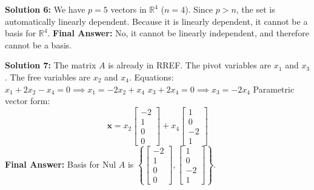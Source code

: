 \documentclass[11pt]{article}
\begin{document}
\vspace{0.5cm}
\textbf{Solution 6:}
We have $p=5$ vectors in $\mathbb{R}^4$ ($n=4$). Since $p > n$, the set is automatically linearly dependent. Because it is linearly dependent, it cannot be a basis for $\mathbb{R}^4$.
\textbf{Final Answer:} No, it cannot be linearly independent, and therefore cannot be a basis.

\vspace{0.5cm}
\textbf{Solution 7:}
The matrix $A$ is already in RREF. The pivot variables are $x_1$ and $x_3$. The free variables are $x_2$ and $x_4$.
Equations:
$x_1 + 2x_2 - x_4 = 0 \implies x_1 = -2x_2 + x_4$
$x_3 + 2x_4 = 0 \implies x_3 = -2x_4$
Parametric vector form:
$$ \mathbf{x} = x_2 \begin{bmatrix} -2 \\ 1 \\ 0 \\ 0 \end{bmatrix} + x_4 \begin{bmatrix} 1 \\ 0 \\ -2 \\ 1 \end{bmatrix} $$
\textbf{Final Answer:} Basis for Nul $A$ is $\left\{ \begin{bmatrix} -2 \\ 1 \\ 0 \\ 0 \end{bmatrix}, \begin{bmatrix} 1 \\ 0 \\ -2 \\ 1 \end{bmatrix} \right\}$.
\end{document}
